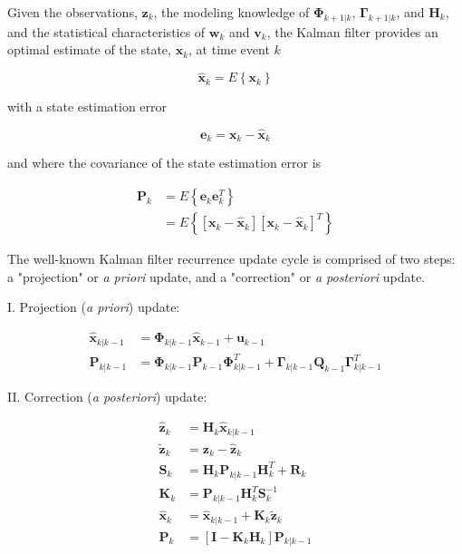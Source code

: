 \documentclass[12pt]{article}
\begin{document}
Given the observations, $\mathbf{z}_k$,
the modeling knowledge of $\mathbf{\Phi}_{k+1|k}$, $\mathbf{\Gamma}_{k+1|k}$, and $\mathbf{H}_k$,
and the statistical characteristics of $\mathbf{w}_k$ and $\mathbf{v}_k$,
the Kalman filter provides an optimal estimate of the state, $\mathbf{x}_k$, at time event $k$

\begin{equation*}
    \hat{\mathbf{x}}_k = E \left\{ \mathbf{x}_k \right\}
\end{equation*}

with a state estimation error

\begin{equation*}
    \mathbf{e}_k = \mathbf{x}_{k} - \hat{\mathbf{x}}_k
\end{equation*}

and where the covariance of the state estimation error is

\begin{equation*}
    \begin{aligned}
        \mathbf{P}_k &= E \left\{ \mathbf{e}_k \mathbf{e}_k^T \right\} \\
        &= E \left\{ \left[ \mathbf{x}_{k} - \hat{\mathbf{x}}_k \right] \left[ \mathbf{x}_{k} - \hat{\mathbf{x}}_k \right]^T \right\}
    \end{aligned}
\end{equation*}

The well-known Kalman filter recurrence update cycle is comprised of two steps:
a "projection" or \textit{a priori} update, and a "correction" or \textit{a posteriori} update.

I. Projection (\textit{a priori}) update:

\begin{equation*}
    \begin{aligned}
        \hat{\mathbf{x}}_{k|k-1} &= \mathbf{\Phi}_{k|k-1} \hat{\mathbf{x}}_{k-1} + \mathbf{u}_{k-1} \\
        \mathbf{P}_{k|k-1} &= \mathbf{\Phi}_{k|k-1} \mathbf{P}_{k-1} \mathbf{\Phi}_{k|k-1}^T + \mathbf{\Gamma}_{k|k-1} \mathbf{Q}_{k-1} \mathbf{\Gamma}_{k|k-1}^T
    \end{aligned}
\end{equation*}

II. Correction (\textit{a posteriori}) update:

\begin{equation*}
    \begin{aligned}
        \hat{\mathbf{z}}_k &= \mathbf{H}_k \hat{\mathbf{x}}_{k|k-1} \\
        \tilde{\mathbf{z}}_k &= \mathbf{z}_k - \hat{\mathbf{z}}_k \\
        \mathbf{S}_k &= \mathbf{H}_k \mathbf{P}_{k|k-1} \mathbf{H}_k^T + \mathbf{R}_k \\
        \mathbf{K}_k &= \mathbf{P}_{k|k-1} \mathbf{H}_{k}^T \mathbf{S}_k^{-1} \\
        \hat{\mathbf{x}}_k &= \hat{\mathbf{x}}_{k|k-1} +\mathbf{K}_k \tilde{\mathbf{z}}_k \\
        \mathbf{P}_k &= \left[ \mathbf{I} - \mathbf{K}_k \mathbf{H}_k \right] \mathbf{P}_{k|k-1}
    \end{aligned}
\end{equation*}
\end{document}

